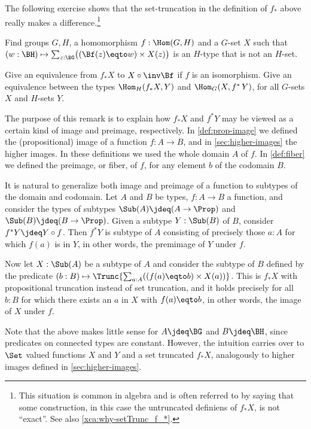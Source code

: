 The following exercise shows that the set-truncation in the definition
of $f_*$ above really makes a difference.\footnote{%
    This situation is common in algebra and is often referred to by saying
    that some construction, in this case the untruncated
    definiens of $f_*X$, is not ``exact''. See also \cref{xca:why-setTrunc_f_*}.}

\begin{xca}\label{xca:why-setTrunc_f_*}
Find groups $G,H$, a homomorphism $f:\Hom(G,H)$ and a $G$-set $X$ such 
that $(w:\BH)\mapsto\sum_{z:\BG}\bigl((\Bf(z) \eqto w)\times X(z)\bigr)$
is an $H$-type that is not an $H$-set.
\end{xca}

\begin{xca}\label{xca:adjunction-^*-_*}
    Give an equivalence from $f_*X$ to $X\circ\inv\Bf$
    if $f$ is an isomorphism. Give an equivalence between the
    types $\Hom_H(f_*X,Y)$ and $\Hom_G(X,f^*\,Y)$, 
    for all $G$-sets $X$ and $H$-sets $Y$.
\end{xca}

\begin{remark}\label{rem:^*-_*-as-(pre)image}
The purpose of this remark is to explain how
$f_*X$ and $f^*Y$ may be viewed as a certain kind of
image and preimage, respectively. In \cref{def:prop-image}
we defined the (propositional) image of a function $f:A\to B$,
and in \cref{sec:higher-images} the higher images. In these
definitions we used the whole domain $A$ of $f$.
In \cref{def:fiber} we defined the preimage, or fiber, of $f$,
for any element $b$ of the codomain $B$. 

It is natural to generalize both image and preimage of 
a function to subtypes of
the domain and codomain. Let $A$ and $B$ be types, $f:A\to B$
a function, and consider the types of subtypes $\Sub(A)\jdeq(A\to\Prop)$
and $\Sub(B)\jdeq(B\to\Prop)$. Given a subtype $Y:\Sub(B)$ of $B$,
consider $f^*Y \jdeq Y\circ f$. Then $f^*Y$ is subtype of $A$ 
consisting of precisely those $a:A$ for which $f(a)$ is in $Y$,
in other words, the premimage of $Y$ under $f$.

Now let $X:\Sub(A)$ be a subtype of $A$ and consider the subtype of
$B$ defined by the predicate
$(b:B)\mapsto\Trunc{\sum_{a:A}((f(a) \eqto b)\times X(a))}$.
This is $f_*X$ with propositional truncation instead of set truncation,
and it holds precisely for all $b:B$ for which there
exists an $a$ in $X$ with $f(a)\eqto b$,
in other words, the image of $X$ under $f$.

Note that the above makes little sense for $A\jdeq\BG$ and $B\jdeq\BH$,
since predicates on connected types are constant. However, the intuition
carries over to $\Set$ valued functions $X$ and $Y$ and a set truncated
$f_*X$, analogously to higher images defined in \cref{sec:higher-images}.
\end{remark}

